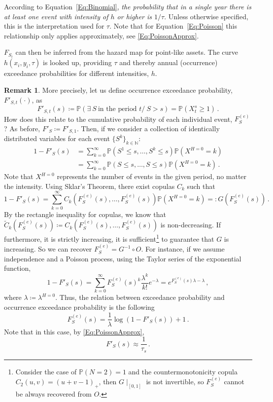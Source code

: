\documentclass[a4paper,11pt]{extarticle} %
\theoremstyle{definition}
\newtheorem{remarkx}[theorem]{Remark}
\newenvironment{remark}
{\pushQED{\qed}\renewcommand{\qedsymbol}{$\diamond$}\begin{remarkx}}
    {\popQED\end{remarkx}}
\begin{document}
According to Equation~\ref{Eq:Binomial}, \emph{the probability that in a single year there is at least one event with intensity of $h$ or higher is $1/\tau$}. Unless otherwise specified, this is the interpretation used for $\tau$. Note that for Equation~\ref{Eq:Poisson} this relationship only applies approximately, see \eqref{Eq:PoissonApprox}.


$F_{S_i}$ can then be inferred from the hazard map for point-like assets. The curve $h(x_i, y_i, \tau)$ is looked up, providing $\tau$ and thereby annual (occurrence) exceedance probabilities for different intensities, $h$.

\begin{remark}\label{rem:OEPvsFS}
    More precisely, let us define occurrence exceedance probability, $F'_{S,t}(\cdot)$, as
    \begin{equation}\label{Eq:DefOEP}
        F'_{S,t}(s)\coloneqq \mathbb{P}\left(\exists~S~\text{in the period }t/~S>s\right)=\mathbb{P}\left(X_t^s\ge 1\right)\,.
    \end{equation}
    How does this relate to the cumulative probability of each individual event,  $F^{(e)}_S$? As before, $F'_S\coloneqq F'_{S,1}$. Then, if we consider a collection of identically distributed variables for each event $\{S^k\}_{k\in \mathbb{N}}$:
    \begin{align*}
        1-F'_S(s)&=\sum_{k=0}^{\infty} \mathbb{P}\left(S^1\le s,\ldots, S^k\le s\right)\mathbb{P}\left(X^{H=0}=k\right)\\
        &=\sum_{k=0}^{\infty} \mathbb{P}\left(S\le s,\ldots, S\le s\right)\mathbb{P}\left(X^{H=0}=k\right)\,.
    \end{align*}
Note that $X^{H=0}$ represents the number of events in the given period, no matter the intensity. Using Sklar's Theorem, there exist copulas $C_k$ such that
    \begin{equation*}
        1-F'_S(s)=\sum_{k=0}^{\infty} C_k\left(F^{(e)}_S(s),\ldots, F^{(e)}_S(s)\right)\mathbb{P}\left(X^{H=0}=k\right)=:G(F^{(e)}_S(s))\,.
    \end{equation*}
By the rectangle inequality for copulas, we know that $\tilde{C}_k(F^{(e)}_S(s))\coloneqq C_k\left(F^{(e)}_S(s),\ldots, F^{(e)}_S(s)\right)$ is non-decreasing. If furthermore, it is strictly increasing, it is sufficient\footnote{Consider the case of $\mathbb{P}(N=2)=1$ and the countermonotonicity copula $C_2(u,v)=(u+v-1)_+$, then $G\mid_{[0,1]}$ is not invertible, so $F^{(e)}_S$ cannot be always recovered from $O$.} to guarantee that $G$ is increasing. So we can recover $F^{(e)}_S=G^{-1}\circ O$. For instance, if we assume independence and a Poisson process, using the Taylor series of the exponential function,
\begin{equation}
    1-F'_S(s) = \sum_{k=0}^{\infty}F^{(e)}_S(s)^k \frac{\lambda^k}{k!}e^{-\lambda}=e^{F^{(e)}_S(s)\lambda -\lambda}\,,
\end{equation}
where $\lambda\coloneqq \lambda^{H=0}$. Thus, the relation between exceedance probability and occurrence exceedance probability is the following
$$
F^{(e)}_S(s)=\frac1\lambda\log\left(1-F'_S(s)\right)+1\,.
$$
Note that in this case, by \eqref{Eq:PoissonApprox},
$$
F'_S(s)\approx\frac1{\tau_s}\,.
$$
\end{remark}
\end{document}

